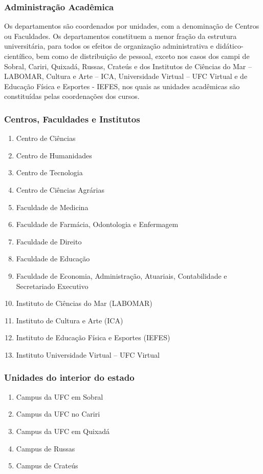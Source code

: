 \documentclass{report}
\begin{document}
\subsubsection{Administração Acadêmica}

Os departamentos são coordenados por unidades, com a denominação de Centros ou Faculdades.
Os departamentos constituem a menor fração da estrutura universitária, para todos os efeitos de organização administrativa e didático-científico, bem como de distribuição de pessoal, exceto nos casos dos campi de Sobral, Cariri, Quixadá, Russas, Crateús e dos Institutos de Ciências do Mar – LABOMAR, Cultura e Arte – ICA, Universidade Virtual – UFC Virtual e de Educação Física e Esportes - IEFES, nos quais as unidades acadêmicas são constituídas pelas coordenações dos cursos.

\subsubsection{Centros, Faculdades e Institutos}

\begin{enumerate}
\item Centro de Ciências
\item Centro de Humanidades
\item Centro de Tecnologia
\item Centro de Ciências Agrárias
\item Faculdade de Medicina
\item Faculdade de Farmácia, Odontologia e Enfermagem
\item Faculdade de Direito
\item Faculdade de Educação
\item Faculdade de Economia, Administração, Atuariais, Contabilidade e Secretariado Executivo
\item Instituto de Ciências do Mar (LABOMAR)
\item Instituto de Cultura e Arte (ICA)
\item Instituto de Educação Física e Esportes (IEFES)
\item Instituto Universidade Virtual – UFC Virtual
\end{enumerate}

\subsubsection{Unidades do interior do estado}

\begin{enumerate}
\item Campus da UFC em Sobral
\item Campus da UFC no Cariri
\item Campus da UFC em Quixadá
\item Campus de Russas
\item Campus de Crateús
\end{enumerate}
\end{document}
